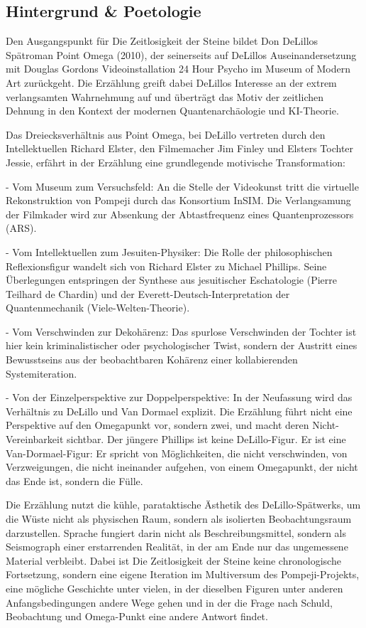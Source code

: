 \documentclass[
  ngerman,
]{article}
\begin{document}
\subsection{Hintergrund \& Poetologie}\label{hintergrund-poetologie}

Den Ausgangspunkt für Die Zeitlosigkeit der Steine bildet Don DeLillos
Spätroman Point Omega (2010), der seinerseits auf DeLillos
Auseinandersetzung mit Douglas Gordons Videoinstallation 24 Hour Psycho
im Museum of Modern Art zurückgeht. Die Erzählung greift dabei DeLillos
Interesse an der extrem verlangsamten Wahrnehmung auf und überträgt das
Motiv der zeitlichen Dehnung in den Kontext der modernen
Quantenarchäologie und KI-Theorie.

Das Dreiecksverhältnis aus Point Omega, bei DeLillo vertreten durch den
Intellektuellen Richard Elster, den Filmemacher Jim Finley und Elsters
Tochter Jessie, erfährt in der Erzählung eine grundlegende motivische
Transformation:

- Vom Museum zum Versuchsfeld: An die Stelle der Videokunst tritt die
virtuelle Rekonstruktion von Pompeji durch das Konsortium InSIM. Die
Verlangsamung der Filmkader wird zur Absenkung der Abtastfrequenz eines
Quantenprozessors (ARS).

- Vom Intellektuellen zum Jesuiten-Physiker: Die Rolle der
philosophischen Reflexionsfigur wandelt sich von Richard Elster zu
Michael Phillips. Seine Überlegungen entspringen der Synthese aus
jesuitischer Eschatologie (Pierre Teilhard de Chardin) und der
Everett-Deutsch-Interpretation der Quantenmechanik
(Viele-Welten-Theorie).

- Vom Verschwinden zur Dekohärenz: Das spurlose Verschwinden der Tochter
ist hier kein kriminalistischer oder psychologischer Twist, sondern der
Austritt eines Bewusstseins aus der beobachtbaren Kohärenz einer
kollabierenden Systemiteration.

- Von der Einzelperspektive zur Doppelperspektive: In der Neufassung
wird das Verhältnis zu DeLillo und Van Dormael explizit. Die Erzählung
führt nicht eine Perspektive auf den Omegapunkt vor, sondern zwei, und
macht deren Nicht-Vereinbarkeit sichtbar. Der jüngere Phillips ist keine
DeLillo-Figur. Er ist eine Van-Dormael-Figur: Er spricht von
Möglichkeiten, die nicht verschwinden, von Verzweigungen, die nicht
ineinander aufgehen, von einem Omegapunkt, der nicht das Ende ist,
sondern die Fülle.

Die Erzählung nutzt die kühle, parataktische Ästhetik des
DeLillo-Spätwerks, um die Wüste nicht als physischen Raum, sondern als
isolierten Beobachtungsraum darzustellen. Sprache fungiert darin nicht
als Beschreibungsmittel, sondern als Seismograph einer erstarrenden
Realität, in der am Ende nur das ungemessene Material verbleibt. Dabei
ist Die Zeitlosigkeit der Steine keine chronologische Fortsetzung,
sondern eine eigene Iteration im Multiversum des Pompeji-Projekts, eine
mögliche Geschichte unter vielen, in der dieselben Figuren unter anderen
Anfangsbedingungen andere Wege gehen und in der die Frage nach Schuld,
Beobachtung und Omega-Punkt eine andere Antwort findet.
\end{document}
